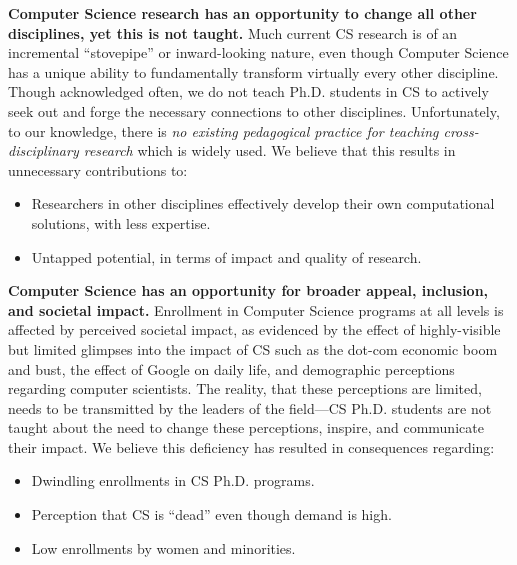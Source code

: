 {\bf Computer Science research has an opportunity to change all
other disciplines, yet this is not taught.}  Much current CS
research is of an incremental ``stovepipe'' or inward-looking
nature, even though Computer Science has a unique ability to
fundamentally transform virtually every other discipline.  Though
acknowledged often, we do not teach Ph.D. students in CS to actively
seek out and forge the necessary connections to other disciplines.
Unfortunately, to our knowledge, there is {\it no existing
pedagogical practice for teaching cross-disciplinary research} which is
widely used.  We believe that this results in unnecessary contributions to:
  \begin{itemize}
\itemsep=-1pt
  \item Researchers in other disciplines effectively develop their own
        computational solutions, with less expertise.
  \item Untapped potential, in terms of impact and quality of research.
  \end{itemize}

{\bf Computer Science has an opportunity for broader appeal,
  inclusion, and societal impact.}  Enrollment in Computer Science
  programs at all levels is affected by perceived societal impact, as
  evidenced by the effect of highly-visible but limited glimpses into
  the impact of CS such as the dot-com economic boom and bust, the
  effect of Google on daily life, and demographic perceptions
  regarding computer scientists.  The reality, that these perceptions
  are limited, needs to be transmitted by the leaders of the field---CS
  Ph.D. students are not taught about the need to change these
  perceptions, inspire, and communicate their impact.  We believe
  this deficiency has resulted in consequences regarding:
  \begin{itemize}
\itemsep=-1pt
  \item Dwindling enrollments in CS Ph.D. programs.
  \item Perception that CS is ``dead'' even though demand is high.
  \item Low enrollments by women and minorities.
  \end{itemize}

